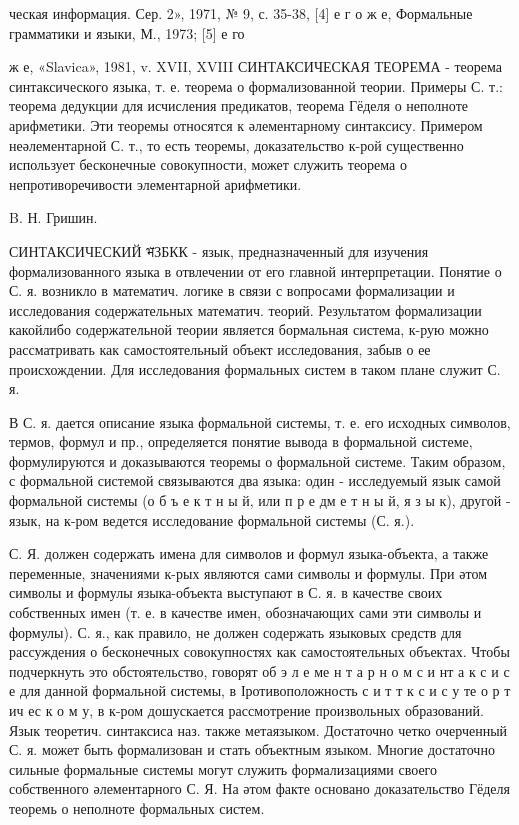 \documentclass[10pt]{article}
\begin{document}
ческая информация. Сер. 2», 1971, № 9, с. 35-38, [4] е г о ж е, Формальные грамматики и языки, М., 1973; [5] е го

ж е, «Slavica», 1981, v. XVII, XVIII СИНТАКСИЧЕСКАЯ ТЕОРЕМА - теорема синтаксического языка, т. е. теорема о формализованной теории. Примеры С. т.: теорема дедукции для исчисления предикатов, теорема Гёделя о неполноте арифметики. Эти теоремы относятся к әлементарному синтаксису. Примером неәлементарной С. т., то есть теоремы, доказательство к-рой существенно использует бесконечные совокупности, может служить теорема о непротиворечивости элементарной арифметики.



B. Н. Гришин.



СИНТАКСИЧЕСКИЙ भ̆ЗБКК - язык, предназначенный для изучения формализованного языка в отвлечении от его главной интерпретации. Понятие о С. я. возникло в математич. логике в связи с вопросами формализации и исследования содержательных математич. теорий. Результатом формализации какойлибо содержательной теории является бормальная система, к-рую можно рассматривать как самостоятельный объект исследования, забыв о ее происхождении. Для исследования формальных систем в таком плане служит С. я.



В С. я. дается описание языка формальной системы, т. е. его исходных символов, термов, формул и пр., определяется понятие вывода в формальной системе, формулируются и доказываются теоремы о формальной системе. Таким образом, с формальной системой связываются два языка: один - исследуемый язык самой формальной системы (о б ъ е к т н ы й, или п р е дм е т н ы й, я з ы к), другой - язык, на к-ром ведется исследование формальной системы (С. я.).



С. Я. должен содержать имена для символов и формул языка-объекта, а также переменные, значениями к-рых являются сами символы и формулы. При әтом символы и формулы языка-объекта выступают в С. я. в качестве своих собственных имен (т. е. в качестве имен, обозначающих сами эти символы и формулы). С. я., как правило, не должен содержать языковых средств для рассуждения о бесконечных совокупностях как самостоятельных объектах. Чтобы подчеркнуть это обстоятельство, говорят об э л е ме н т а р н о м с и нт а к с и с е для данной формальной системы, в Іротивоположность с и т т к с и с у те о р т ич ес к о м у, в к-ром дошускается рассмотрение произвольных образований. Язык теоретич. синтаксиса наз. также метаязыком. Достаточно четко очерченный С. я. может быть формализован и стать объектным языком. Многие достаточно сильные формальные системы могут служить формализациями своего собственного әлементарного С. Я. На әтом факте основано доказательство Гёделя теоремь о неполноте формальных систем.
\end{document}
